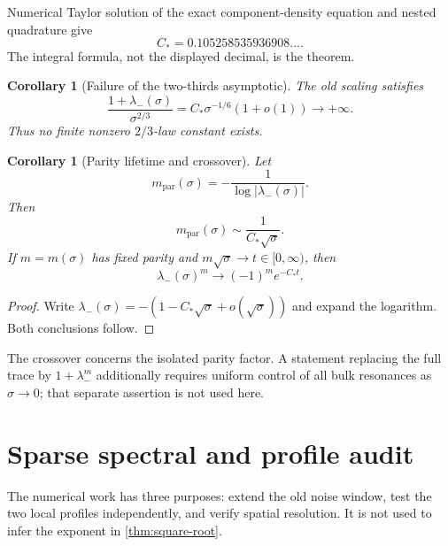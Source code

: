 \documentclass[11pt]{article}
\newtheorem{corollary}[theorem]{Corollary}
\theoremstyle{definition}
\theoremstyle{remark}
\begin{document}
Numerical Taylor solution of the exact component-density equation and nested
quadrature give
\begin{equation}\label{eq:C-numerical}
 \boxed{C_*=0.105258535936908\ldots.}
\end{equation}
The integral formula, not the displayed decimal, is the theorem.

\begin{corollary}[Failure of the two-thirds asymptotic]
\label{cor:not-two-thirds}
The old scaling satisfies
\begin{equation}\label{eq:two-thirds-divergence}
 \frac{1+\lambda_-(\sigma)}{\sigma^{2/3}}
 =C_*\sigma^{-1/6}(1+o(1))\longrightarrow+\infty.
\end{equation}
Thus no finite nonzero $2/3$-law constant exists.
\end{corollary}

\begin{corollary}[Parity lifetime and crossover]
\label{cor:lifetime}
Let
\begin{equation}\label{eq:lifetime-definition}
 m_{\mathrm{par}}(\sigma)
 =-\frac1{\log|\lambda_-(\sigma)|}.
\end{equation}
Then
\begin{equation}\label{eq:lifetime-law}
 m_{\mathrm{par}}(\sigma)
 \sim\frac1{C_*\sqrt\sigma}.
\end{equation}
If $m=m(\sigma)$ has fixed parity and
$m\sqrt\sigma\to t\in[0,\infty)$, then
\begin{equation}\label{eq:peripheral-crossover}
 \lambda_-(\sigma)^m
 \longrightarrow(-1)^m e^{-C_*t}.
\end{equation}
\end{corollary}

\begin{proof}
Write
$\lambda_-(\sigma)=-(1-C_*\sqrt\sigma+o(\sqrt\sigma))$ and expand the
logarithm.  Both conclusions follow.
\end{proof}

The crossover concerns the isolated parity factor.  A statement replacing
the full trace by $1+\lambda_-^m$ additionally requires uniform control of all
bulk resonances as $\sigma\to0$; that separate assertion is not used here.

\section{Sparse spectral and profile audit}
\label{sec:numerics}

The numerical work has three purposes: extend the old noise window, test the
two local profiles independently, and verify spatial resolution.  It is not
used to infer the exponent in \cref{thm:square-root}.
\end{document}
